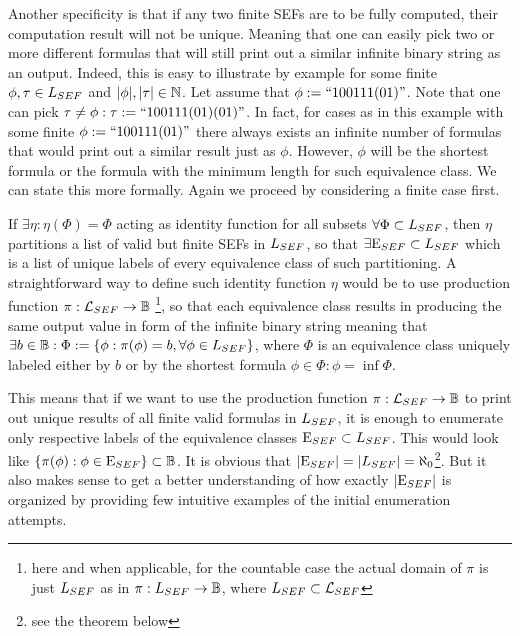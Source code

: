 Another specificity is that if any two finite SEFs are to be fully computed, their computation result will not be unique. Meaning that one can easily pick two or more different formulas that will still print out a similar infinite binary string as an output. Indeed, this is easy to illustrate by example for some finite $\phi, \tau \in L_{SEF}$ and $ |\phi|, |\tau| \in \mathbb{N}$. Let assume that $\phi := \text{``}100111(01)\text{''}$. Note that one can pick $\tau \neq \phi: \tau := \text{``}100111(01)(01)\text{''}$. In fact, for cases as in this example with some finite $\phi := \text{``}100111(01)\text{''}$ there always exists an infinite number of formulas that would print out a similar result just as $\phi$. However, $\phi$ will be the shortest formula or the formula with the minimum length for such equivalence class. We can state this more formally. Again we proceed by considering a finite case first.

\begin{definition}
  If $\exists \eta: \eta(\Phi) = \Phi$ acting as identity function for all subsets $\forall \Phi \subset L_{SEF}$, then $\eta$ partitions a list of valid but finite SEFs in $L_{SEF}$, so that $\exists \mathrm{E}_{SEF} \subset L_{SEF}$ which is a list of unique labels of every equivalence class of such partitioning. A straightforward way to define such identity function $\eta$ would be to use production function $\pi: \mathcal{L}_{SEF} \to \mathbb{B}$ \footnote{here and when applicable, for the countable case the actual domain of $\pi$ is just $L_{SEF}$ as in $\pi: L_{SEF} \to \mathbb{B}$, where $L_{SEF} \subset \mathcal{L}_{SEF}$}, so that each equivalence class results in producing the same output value in form of the infinite binary string meaning that $\exists b \in \mathbb{B} : \Phi := \{\phi : \pi(\phi) = b, \forall \phi \in L_{SEF} \}$, where $\Phi$ is an equivalence class uniquely labeled either by $b$ or by the shortest formula $\phi \in \Phi : \phi = \inf \Phi$.
\end{definition}

This means that if we want to use the production function $\pi: \mathcal{L}_{SEF} \to \mathbb{B}$ to print out unique results of all finite valid formulas in $L_{SEF}$, it is enough to enumerate only respective labels of the equivalence classes $\mathrm{E}_{SEF} \subset L_{SEF}$. This would look like $\{\pi(\phi): \phi \in \mathrm{E}_{SEF}\} \subset \mathbb{B}$. It is obvious that $|\mathrm{E}_{SEF}| = |L_{SEF}| = \aleph_0$\footnote{see the theorem below}. But it also makes sense to get a better understanding of how exactly $|\mathrm{E}_{SEF}|$ is organized by providing few intuitive examples of the initial enumeration attempts.

